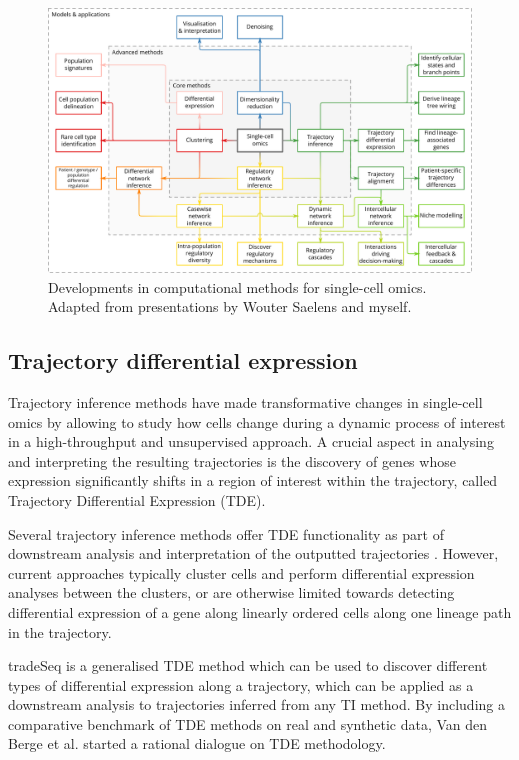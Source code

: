 \begin{figure}[htb!]
	\centering
	\includegraphics[width=\linewidth]{fig/singlecell_technologies_v8.pdf}
	\caption{Developments in computational methods for single-cell omics. Adapted from presentations by Wouter Saelens and myself.}
	\label{fig:scapplications_extended}
\end{figure}


\subsection{Trajectory differential expression}
Trajectory inference methods have made transformative changes in single-cell omics by allowing to study how cells change during a dynamic process of interest in a high-throughput and unsupervised approach. 
A crucial aspect in analysing and interpreting the resulting trajectories is the discovery of genes whose expression significantly shifts in a region of interest within the trajectory, called Trajectory Differential Expression (TDE).

Several trajectory inference methods offer TDE functionality as part of downstream analysis and interpretation of the outputted trajectories \cite{cannoodt_scorpiusimprovestrajectory_2016,qiu_reversedgraphembedding_2017,lonnberg_singlecellrnaseqcomputational_2017,wolf_pagagraphabstraction_2019}. However, current approaches typically cluster cells and perform differential expression analyses between the clusters, or are otherwise limited towards detecting differential expression of a gene along linearly ordered cells along one lineage path in the trajectory.

tradeSeq \cite{vandenberge_trajectorybaseddifferentialexpression_2019} is a generalised TDE method which can be used to discover different types of differential expression along a trajectory, which can be applied as a downstream analysis to trajectories inferred from any TI method. By including a comparative benchmark of TDE methods on real and synthetic data, Van den Berge et al. started a rational dialogue on TDE methodology.

